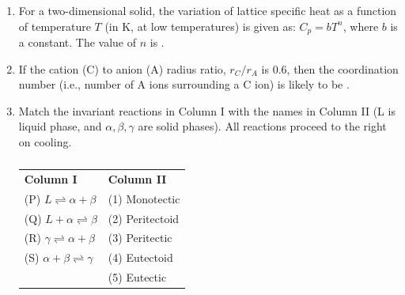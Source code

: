 \documentclass[a4paper,10pt]{article}
\begin{document}
\begin{enumerate}
    \item For a two-dimensional solid, the variation of lattice specific heat as a function of temperature $T$ (in K, at low temperatures) is given as: $C_p = bT^n$, where $b$ is a constant. The value of $n$ is \underline{\hspace{2cm}}.
    \hfill{}

    \item If the cation (C) to anion (A) radius ratio, $r_C/r_A$ is 0.6, then the coordination number (i.e., number of A ions surrounding a C ion) is likely to be \underline{\hspace{2cm}}.
    \hfill{}

    \item Match the invariant reactions in Column I with the names in Column II (L is liquid phase, and $\alpha, \beta, \gamma$ are solid phases). All reactions proceed to the right on cooling.
    \begin{table}[h!] \centering \caption*{} \label{tab:q10_material_2018}
        \begin{tabular}{ll}
            \textbf{Column I} & \textbf{Column II} \\
            (P) $L \rightleftharpoons \alpha + \beta$ & (1) Monotectic \\
            (Q) $L + \alpha \rightleftharpoons \beta$ & (2) Peritectoid \\
            (R) $\gamma \rightleftharpoons \alpha + \beta$ & (3) Peritectic \\
            (S) $\alpha + \beta \rightleftharpoons \gamma$ & (4) Eutectoid \\
            & (5) Eutectic \\
        \end{tabular}
    \end{table}
    \hfill{}
    \begin{enumerate}[label=\Alph*)]
    \end{enumerate}


\end{enumerate}
\end{document}
